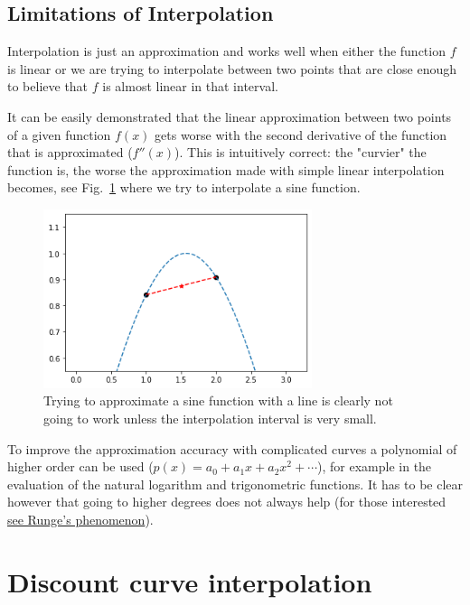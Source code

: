 \subsection{Limitations of Interpolation}
Interpolation is just an approximation and works well when either the function $f$ is linear or we are trying to interpolate between two points that are close enough to believe that $f$ is almost linear in that interval.

It can be easily demonstrated that the linear approximation between two points of a given function $f(x)$ gets worse with the second derivative of the function that is approximated ($f''(x)$). This is intuitively correct: the "curvier" the function is, the worse the approximation made with simple linear interpolation becomes, see Fig.~\ref{fig:sine_interp} where we try to interpolate a sine function.

\begin{figure}
  \centering
  \includegraphics[width=0.7\textwidth]{wrong_interp.png}
  \caption{Trying to approximate a sine function with a line is clearly not going to work unless the interpolation interval is very small.}
  \label{fig:sine_interp}
\end{figure}

To improve the approximation accuracy with complicated curves a polynomial of higher order can be used ($𝑝(𝑥)=𝑎_0 + 𝑎_1 𝑥+ 𝑎_2 𝑥^2+\cdots$), for example in the evaluation of the natural logarithm and trigonometric functions. It has to be clear however that going to higher degrees does not always help (for those interested \href{https://en.wikipedia.org/wiki/Runge%27s_phenomenon}{see Runge's phenomenon}).

\section{Discount curve interpolation}\label{discount-curve-interpolation}

